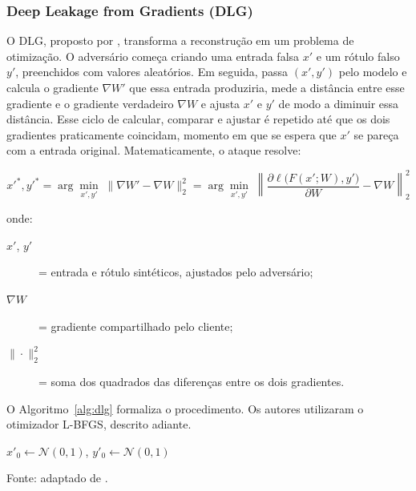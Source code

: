 \subsubsection{Deep Leakage from Gradients (DLG)}

O DLG, proposto por , transforma a reconstrução em um problema de otimização. O adversário começa criando uma entrada falsa $x'$ e um rótulo falso $y'$, preenchidos com valores aleatórios. Em seguida, passa $(x', y')$ pelo modelo e calcula o gradiente $\nabla W'$ que essa entrada produziria, mede a distância entre esse gradiente e o gradiente verdadeiro $\nabla W$ e ajusta $x'$ e $y'$ de modo a diminuir essa distância. Esse ciclo de calcular, comparar e ajustar é repetido até que os dois gradientes praticamente coincidam, momento em que se espera que $x'$ se pareça com a entrada original. Matematicamente, o ataque resolve:

\begin{equation} \label{eq:dlg}
x'^{*}, y'^{*} = \arg\min_{x', y'} \; \big\| \nabla W' - \nabla W \big\|_2^{2} = \arg\min_{x', y'} \; \left\| \frac{\partial \ell\big(F(x'; W), y'\big)}{\partial W} - \nabla W \right\|_2^{2}
\end{equation}

\noindent onde:
\begin{description}
  \item[$x'$, $y'$] = entrada e rótulo sintéticos, ajustados pelo adversário;
  \item[$\nabla W$] = gradiente compartilhado pelo cliente;
  \item[$\|\cdot\|_2^2$] = soma dos quadrados das diferenças entre os dois gradientes.
\end{description}

O Algoritmo~\ref{alg:dlg} formaliza o procedimento. Os autores utilizaram o otimizador L-BFGS, descrito adiante.

\begin{algorithm2e}[H]
\caption{Deep Leakage from Gradients (DLG)}
\label{alg:dlg}
$x'_0 \leftarrow \mathcal{N}(0, 1)$, \quad $y'_0 \leftarrow \mathcal{N}(0, 1)$\;
\;
\end{algorithm2e}
\vspace{-4mm}
\begin{center}\small Fonte: adaptado de .\end{center}

